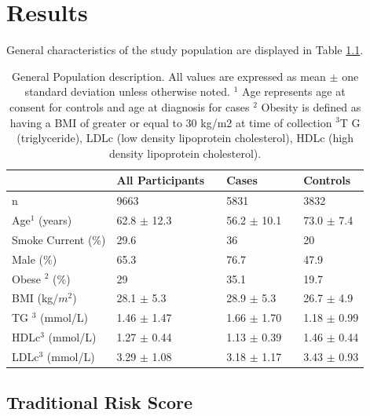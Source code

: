 \chapter{Results}
\let\cleardoublepage\clearpage 

General characteristics of the study population are displayed in Table \ref{pop}.
\tabularnewline
\tabularnewline

\begin{table}[bp]
\centering
\begin{tabular}{llllll}
\hline
                   & All Participants &  & Cases       &  & Controls    \\ \hline
n                  & 9663             &  & 5831        &  & 3832        \\
Age$^1$ (years)       & 62.8 $\pm$ 12.3      &  & 56.2 $\pm$ 10.1 &  & 73.0 $\pm$ 7.4  \\
Smoke Current (\%) & 29.6             &  & 36          &  & 20          \\
Male (\%)          & 65.3             &  & 76.7        &  & 47.9        \\
Obese $^2$ (\%)       & 29               &  & 35.1        &  & 19.7        \\
BMI (kg/$m^2$)        & 28.1 $\pm$ 5.3       &  & 28.9 $\pm$ 5.3  &  & 26.7 $\pm$ 4.9  \\
TG $^3$ (mmol/L)      & 1.46 $\pm$ 1.47      &  & 1.66 $\pm$ 1.70 &  & 1.18 $\pm$ 0.99 \\
HDLc$^3$ (mmol/L)     & 1.27 $\pm$ 0.44      &  & 1.13 $\pm$ 0.39 &  & 1.46 $\pm$ 0.44 \\
LDLc$^3$ (mmol/L)     & 3.29 $\pm$ 1.08      &  & 3.18 $\pm$ 1.17 &  & 3.43 $\pm$ 0.93 \\ \hline
\end{tabular}
\caption[General Population descriptions.]{General Population description. All values are expressed as mean $\pm$ one standard deviation unless otherwise noted. $^1$  Age represents age at consent for controls and age at diagnosis for cases
 $^2$ Obesity is defined as having a BMI of greater or equal to 30 kg/m2 at time of collection $^3$T G (triglyceride), LDLc (low density lipoprotein cholesterol), HDLc (high density lipoprotein cholesterol).}
\label{pop}
\end{table}


\section{Traditional Risk Score}

